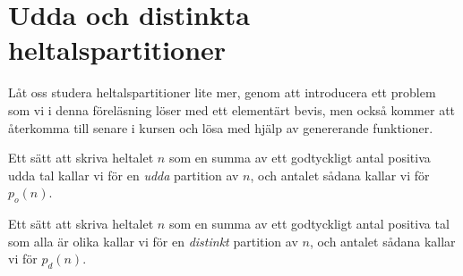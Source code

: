 \documentclass[nobib]{tufte-handout}
\begin{document}
\section{Udda och distinkta heltalspartitioner}

Låt oss studera heltalspartitioner lite mer, genom att introducera ett problem som vi i denna föreläsning löser med ett elementärt bevis, men också kommer att återkomma till senare i kursen och lösa med hjälp av genererande funktioner.

\begin{definition}
  Ett sätt att skriva heltalet $n$ som en summa av ett godtyckligt antal positiva udda tal kallar vi för en \emph{udda} partition av $n$, och antalet sådana kallar vi för $p_o(n)$.

  Ett sätt att skriva heltalet $n$ som en summa av ett godtyckligt antal positiva tal som alla är olika kallar vi för en \emph{distinkt} partition av $n$, och antalet sådana kallar vi för $p_d(n)$.
\end{definition}
\end{document}
